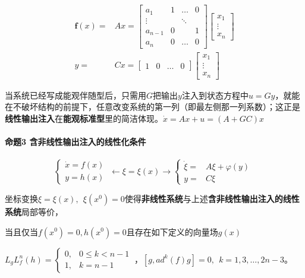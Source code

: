 \documentclass[
  12pt,
  a4paper
]{article}
\begin{document}
\[\begin{aligned}
\mathbf{f}(x) = & Ax = \begin{bmatrix}
a_{1} & 1 & \ldots & 0 \\
 \vdots & & \ddots & \\
a_{n - 1} & 0 & & 1 \\
a_{n} & 0 & \ldots & 0
\end{bmatrix}\begin{bmatrix}
x_{1} \\
 \vdots \\
x_{n}
\end{bmatrix} \\
y = & Cx = \begin{bmatrix}
1 & 0 & \ldots & 0
\end{bmatrix}\begin{bmatrix}
x_{1} \\
 \vdots \\
x_{n}
\end{bmatrix}
\end{aligned}\]

当系统已经写成能观伴随型后，只需用\(G\)把输出\(y\)注入到状态方程中\(u = Gy\)，就能在不破坏结构的前提下，任意改变系统的第一列（即最左侧那一列系数）；这正是\textbf{线性输出注入}在\textbf{能观标准型}里的简洁体现。\(\dot{x} = Ax + u = (A + GC)x\)

\paragraph{命题3
含非线性输出注入的线性化条件}\label{ux547dux98983-ux542bux975eux7ebfux6027ux8f93ux51faux6ce8ux5165ux7684ux7ebfux6027ux5316ux6761ux4ef6}

\[\left\{ \begin{array}{r}
\dot{x} = f(x) \\
y = h(x)
\end{array} \right.\  \leftarrow \xi = \xi(x) \rightarrow \left\{ \begin{aligned}
\dot{\xi} = & A\xi + \varphi(y) \\
y = & C\xi
\end{aligned} \right.\ \]

坐标变换\(\xi = \xi(x),\ \ \xi\left( x^{0} \right) = 0\)使得\textbf{非线性系统}与上述\textbf{含非线性输出注入的线性系统}局部等价，

当且仅当\(f\left( x^{0} \right) = 0,h\left( x^{0} \right) = 0\)且存在如下定义的向量场\(g(x)\)

\(L_{g}L_{f}^{n}(h) = \left\{ \begin{aligned}
0, & 0 \leq k < n - 1 \\
1, & k = n - 1
\end{aligned} \right.\ \)，\(\left\lbrack g,{ad}^{k}(f)g \right\rbrack = 0,\ \ k = 1,3,\ldots,2n - 3\)。
\end{document}
